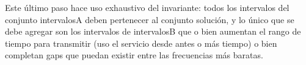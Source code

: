 %

Este \'ultimo paso hace uso exhaustivo del invariante: todos los intervalos del conjunto intervalosA deben pertenecer al conjunto soluci\'on, y lo \'unico que se debe agregar son los intervalos de intervalosB que o bien aumentan el rango de tiempo para transmitir (uso el servicio desde antes o m\'as tiempo) o bien completan gaps que puedan existir entre las frecuencias m\'as baratas.




